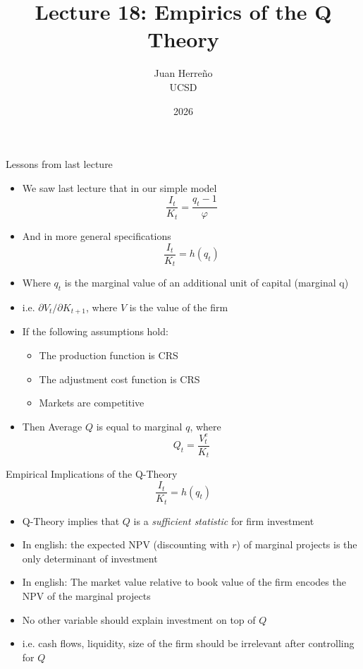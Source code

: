 \documentclass[11pt,aspectratio=169,xcolor={dvipsnames},hyperref={pdftex,pdfpagemode=UseNone,hidelinks,pdfdisplaydoctitle=true},usepdftitle=false]{beamer}
\title{Lecture 18: Empirics of the Q Theory}
\author{Juan Herre\~{n}o\\UCSD}
\date{2026}
\begin{document}
\begin{frame}
  \titlepage
\end{frame}

\begin{frame}{Lessons from last lecture}
\begin{itemize}
\item We saw last lecture that in our simple model
$$\frac{I_t}{K_t} = \frac{q_t - 1}{\varphi}$$
\vspace{-0.5cm}
\pause
\item And in more general specifications
$$\frac{I_t}{K_t} = h(q_t)$$
\vspace{-0.5cm}
\pause
\item Where $q_t$ is the marginal value of an additional unit of capital (marginal q)
\pause
\item i.e. $\partial V_t/ \partial K_{t+1}$, where $V$ is the value of the firm
\pause
\item If the following assumptions hold:
\begin{itemize}
\item The production function is CRS
\item The adjustment cost function is CRS
\item Markets are competitive
\end{itemize}
\item Then Average $Q$ is equal to marginal $q$, where
$$Q_t = \frac{V^e_t}{K_t}$$ 
\end{itemize}
\end{frame}

\begin{frame}{Empirical Implications of the Q-Theory}
$$\frac{I_t}{K_t} = h(q_t)$$
\vspace{-0.5cm}
\pause
\begin{itemize}
\item Q-Theory implies that $Q$ is a \textit{sufficient statistic} for firm investment
\pause
\item In english: the expected NPV (discounting with $r$) of marginal projects is the only determinant of investment
\pause
\item In english: The market value relative to book value of the firm encodes the NPV of the marginal projects
\pause
\item No other variable should explain investment on top of $Q$
\pause
\item i.e. cash flows, liquidity, size of the firm should be irrelevant after controlling for $Q$
\end{itemize}
\end{frame}
\end{document}
